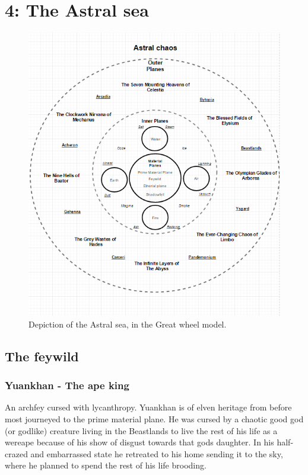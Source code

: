 \documentclass[a4paper]{article}
\begin{document}
\section{4: The Astral sea}
\begin{figure}[h]
\begin{center}
\includegraphics[scale=0.8]{TheAstralSea}
\caption{Depiction of the Astral sea, in the Great wheel model.}\label{TheAstralSea}
\end{center}
\end{figure}

\subsection{The feywild}

\subsubsection{Yuankhan - The ape king}
An archfey cursed with lycanthropy. Yuankhan is of elven heritage from before most journeyed to the prime material plane. He was cursed by a chaotic good god (or godlike) creature living in the Beastlands to live the rest of his life as a wereape because of his show of disgust towards that gods daughter. In his half-crazed and embarrassed state he retreated to his home sending it to the sky, where he planned to spend the rest of his life brooding. 
\end{document}
